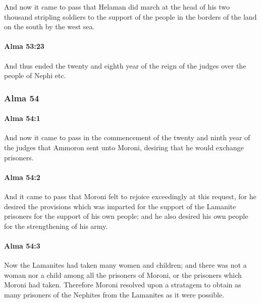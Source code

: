 			And now it came to pass that Helaman did march
			at the head of his two thousand stripling soldiers
			to the support of the people
			in the borders of the land on the south by the west sea.

		\paragraph{Alma 53:23} %
			\label{ALMA-53-23}

			And thus ended the twenty and eighth year
			of the reign of the judges over the people of Nephi etc.

	\subsubsection{Alma 54} %
		\label{ALMA-54}
		
		\paragraph{Alma 54:1} %
			\label{ALMA-54-1}

			And now it came to pass
			in the commencement of the twenty and ninth year of the judges
			that Ammoron sent unto Moroni, desiring that he would exchange prisoners.

		\paragraph{Alma 54:2} %
			\label{ALMA-54-2}

			And it came to pass that Moroni felt to rejoice exceedingly at this request,
			for he desired the provisions
			which was imparted for the support of the Lamanite prisoners
			for the support of his own people;
			and he also desired his own people
			for the strengthening of his army.

		\paragraph{Alma 54:3} %
			\label{ALMA-54-3}

			Now the Lamanites had taken many women and children;
			and there was not a woman nor a child among all the prisoners of Moroni,
			or the prisoners which Moroni had taken.
			Therefore Moroni resolved upon a stratagem to obtain
			as many prisoners of the Nephites from the Lamanites as it were possible.

